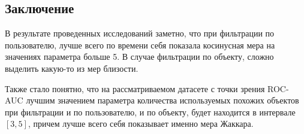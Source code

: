 \subsection*{Заключение}

В результате проведенных исследований заметно, что при фильтрации по пользователю, лучше всего по времени себя показала косинусная мера на значениях параметра больше 5. В случае фильтрации по объекту, сложно выделить какую-то из мер близости.

Также стало понятно, что на рассматриваемом датасете с точки зрения ROC-AUC лучшим значением параметра количества используемых похожих объектов при фильтрации и по пользователю, и по объекту, будет находится в интервале $[3, 5]$, причем лучше всего себя показывает именно мера Жаккара.